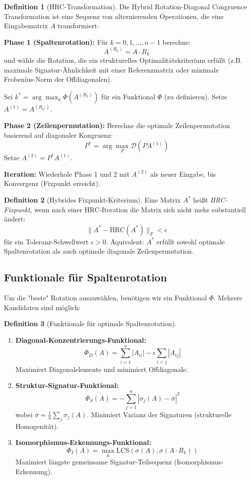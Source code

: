 \documentclass[a4paper,12pt]{article}
\theoremstyle{definition}
\newtheorem{definition}{Definition}
\begin{document}
\begin{definition}[HRC-Transformation]
	Die Hybrid Rotation-Diagonal Congruence Transformation ist eine Sequenz von alternierenden Operationen, die eine Eingabematrix $A$ transformiert:
	
	\textbf{Phase 1 (Spaltenrotation):} Für $k = 0, 1, \ldots, n-1$ berechne:
	\[
	A^{(R_k)} = A \cdot R_k
	\]
	und wähle die Rotation, die ein strukturelles Optimalitätskriterium erfüllt (z.B. maximale Signatur-Ähnlichkeit mit einer Referenzmatrix oder minimale Frobenius-Norm der Offdiagonalen).
	
	Sei $k^* = \arg\max_k \Phi(A^{(R_k)})$ für ein Funktional $\Phi$ (zu definieren). Setze $A^{(1)} = A^{(R_{k^*})}$.
	
	\textbf{Phase 2 (Zeilenpermutation):} Berechne die optimale Zeilenpermutation basierend auf diagonaler Kongruenz:
	\[
	P^* = \arg\max_P \mathcal{D}(PA^{(1)})
	\]
	Setze $A^{(2)} = P^* A^{(1)}$.
	
	\textbf{Iteration:} Wiederhole Phase 1 und 2 mit $A^{(2)}$ als neuer Eingabe, bis Konvergenz (Fixpunkt erreicht).
\end{definition}

\begin{definition}[Hybrides Fixpunkt-Kriterium]
	Eine Matrix $A^*$ heißt \emph{HRC-Fixpunkt}, wenn nach einer HRC-Iteration die Matrix sich nicht mehr substantiell ändert:
	\[
	\|A^* - \text{HRC}(A^*)\|_F < \epsilon
	\]
	für ein Toleranz-Schwellwert $\epsilon > 0$. Äquivalent: $A^*$ erfüllt sowohl optimale Spaltenrotation als auch optimale diagonale Zeilenpermutation.
\end{definition}

\subsection{Funktionale für Spaltenrotation}

Um die "beste" Rotation auszuwählen, benötigen wir ein Funktional $\Phi$. Mehrere Kandidaten sind möglich:

\begin{definition}[Funktionale für optimale Spaltenrotation]
	\begin{enumerate}
		\item \textbf{Diagonal-Konzentrierungs-Funktional:}
		\[
		\Phi_D(A) = \sum_{i=1}^{n} |A_{ii}| - \epsilon \sum_{i < j} |A_{ij}|
		\]
		Maximiert Diagonalelemente und minimiert Offdiagonale.
		
		\item \textbf{Struktur-Signatur-Funktional:}
		\[
		\Phi_S(A) = -\sum_{j=1}^{n} |\sigma_j(A) - \bar{\sigma}|^2
		\]
		wobei $\bar{\sigma} = \frac{1}{n}\sum_j \sigma_j(A)$. Minimiert Varianz der Signaturen (strukturelle Homogenität).
		
		\item \textbf{Isomorphismus-Erkennungs-Funktional:}
		\[
		\Phi_I(A) = \max_k \text{LCS}(\sigma(A), \sigma(A \cdot R_k))
		\]
		Maximiert längste gemeinsame Signatur-Teilsequenz (Isomorphismus-Erkennung).
	\end{enumerate}
\end{definition}
\end{document}
